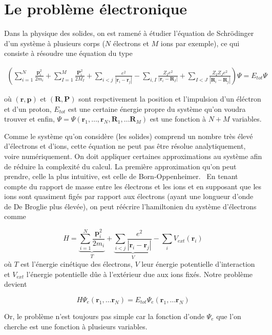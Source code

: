 \documentclass[12pt, french]{report}
\theoremstyle{theoreme}
\begin{document}
\section{Le problème électronique}
Dans la physique des solides, on est ramené à étudier l'équation de Schrödinger d'un système à plusieurs corps ($N$ électrons et $M$ ions par exemple), ce qui consiste à résoudre une équation du type

\begin{equation}
\begin{split}
(\sum_{i=1}^N \frac{\textbf{p}_i^2}{2m_i} + \sum_{I=1}^M \frac{\textbf{P}_i^2}{2M_I}
+ \sum_{i<j}\frac{e^2}{| \textbf{r}_i - \textbf{r}_j |} - \sum_{i, I}\frac{Z_I e^2}{| \textbf{r}_i
- \textbf{R}_I |} + \sum_{I<J}\frac{Z_I Z_J e^2}{| \textbf{R}_i - \textbf{R}_j |} ) \Psi = E_{tot} \Psi
\end{split}
\end{equation}

où $(\textbf{r}, \textbf{p})$ et $(\textbf{R}, \textbf{P})$ sont respctivement la position et l'impulsion d'un éléctron et d'un proton, $E_{tot}$ est une certaine énergie propre du système qu'on voudra trouver et enfin, $\Psi = \Psi(\textbf{r}_1, \ldots, \textbf{r}_N,  \textbf{R}_1, \ldots \textbf{R}_M)$ est une fonction à $N+M $ variables.

Comme le système qu'on considère (les solides) comprend un nombre très élevé d'électrons et d'ions, cette équation ne peut pas être résolue analytiquement, voire numériquement. On doit appliquer certaines approximations au système afin de réduire la complexité du calcul. La première approximation qu'on peut prendre, celle la plus intuitive, est celle de Born-Oppenheimer.~\cite{Bor27}
En tenant compte du rapport de masse entre les électrons et les ions et en supposant que les ions sont quasiment figés par rapport aux électrons (ayant une longueur d'onde de De Broglie plus élevée), on peut réécrire l'hamiltonien du système d'électrons comme

$$
H = \underbrace{\sum_{i=1}^N \frac{\textbf{p}_i^2}{2m_i}}_{T}
+ \underbrace{\sum_{i<j}\frac{e^2}{| \textbf{r}_i - \textbf{r}_j |}}_{V}
- \sum_i V_{ext}(\textbf{r}_i)
$$
où $T$ est l'énergie cinétique des électrons, $V$ leur énergie potentielle d'interaction et $V_{ext}$ l'énergie potentielle dûe à l'extérieur due aux ions fixés.
Notre problème devient

$$
H \Psi_e(\textbf{r}_1, \ldots \textbf{r}_N) = E_{tot} \Psi_e(\textbf{r}_1, \ldots \textbf{r}_N)
$$

Or, le problème n'est toujours pas simple car la fonction d'onde $\Psi_e$ que l'on cherche est une fonction à plusieurs variables. 
\end{document}

